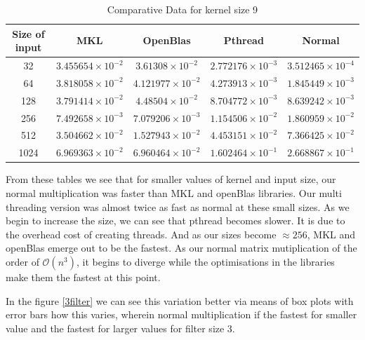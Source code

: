 \documentclass[a4paper]{article}
\begin{document}
\begin{table}[ht]
\caption{Comparative Data for kernel size 9} %
\centering %
\begin{tabular}{c c c c c} %
\hline\hline %
Size of input & MKL & OpenBlas & Pthread & Normal \\ [0.5ex] %
\hline %
32 & $3.455654\times 10^{-2}$ & $3.61308\times 10^{-2}$ & $2.772176\times 10^{-3}$ & $3.512465\times 10^{-4}$  \\
64 & $3.818058\times 10^{-2}$ & $4.121977\times 10^{-2}$ & $4.273913\times 10^{-3}$ & $1.845449\times 10^{-3}$  \\
128 & $3.791414\times 10^{-2}$ & $4.48504\times 10^{-2}$ & $8.704772\times 10^{-3}$ & $8.639242\times 10^{-3}$  \\
256 & $7.492658\times 10^{-3}$ & $7.079206\times 10^{-3}$ & $1.154506\times 10^{-2}$ & $1.860959\times 10^{-2}$  \\
512 & $3.504662\times 10^{-2}$ & $1.527943\times 10^{-2}$ & $4.453151\times 10^{-2}$ & $7.366425\times 10^{-2}$  \\
1024 & $6.969363\times 10^{-2}$ & $6.960464\times 10^{-2}$ & $1.602464\times 10^{-1}$ & $2.668867\times 10^{-1}$  \\[1ex] %
\hline %
\end{tabular}
\label{table:nonn} %
\end{table}

From these tables we see that for smaller values of kernel and input size, our normal multiplication was faster than MKL and openBlas libraries. Our multi threading version was almost twice as fast as normal at these small sizes. As we begin to increase the size, we can see that pthread becomes slower. It is due to the overhead cost of creating threads. And as our sizes become $\approx 256$, MKL and openBlas emerge out to be the fastest. As our normal matrix mutiplication of the order of $\mathcal{O}(n^3)$, it begins to diverge while the optimisations in the libraries make them the fastest at this point.

In the figure \ref{3filter} we can see this variation better via means of box plots with error bars how this varies, wherein normal multiplication if the fastest for smaller value and the fastest for larger values for filter size 3.
\end{document}
